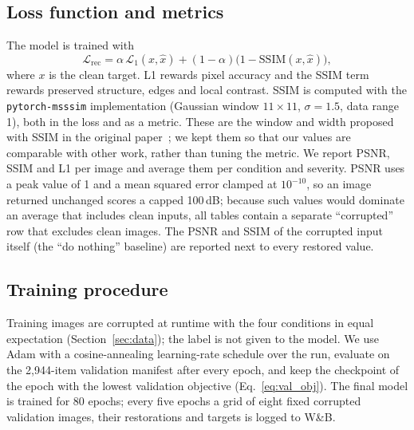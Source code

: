 \documentclass[conference]{IEEEtran}
\begin{document}
\subsection{Loss function and metrics}
The model is trained with
\begin{equation}
\mathcal{L}_{\mathrm{rec}} = \alpha\,\mathcal{L}_{1}(x,\hat{x})
  + (1-\alpha)\bigl(1-\mathrm{SSIM}(x,\hat{x})\bigr),
\label{eq:rec_loss}
\end{equation}
where $x$ is the clean target. L1 rewards pixel accuracy and the SSIM
term~\cite{wang2004ssim} rewards preserved structure, edges and local
contrast. SSIM is computed with the \texttt{pytorch-msssim} implementation
(Gaussian window $11\times11$, $\sigma=1.5$, data range 1), both in the loss
and as a metric.
These are the window and width proposed with SSIM in the original
paper~\cite{wang2004ssim}; we kept them so that our values are comparable with
other work, rather than tuning the metric.
We report PSNR, SSIM and L1 per image and average them per condition and
severity. PSNR uses a peak value of 1 and a mean squared error clamped at
$10^{-10}$, so an image returned unchanged scores a capped 100\,dB; because
such values would dominate an average that includes clean inputs, all
tables contain a separate ``corrupted'' row that excludes clean images. The
PSNR and SSIM of the corrupted input itself (the ``do nothing'' baseline)
are reported next to every restored value.

\subsection{Training procedure}
Training images are corrupted at runtime with the four conditions in equal
expectation (Section~\ref{sec:data}); the label is not given to the model.
We use Adam with a cosine-annealing learning-rate schedule over the run,
evaluate on the 2,944-item validation manifest after every epoch, and keep
the checkpoint of the epoch with the lowest validation objective
(Eq.~\eqref{eq:val_obj}). The final model is trained for 80 epochs; every
five epochs a grid of eight fixed corrupted validation images, their
restorations and targets is logged to W\&B.
\end{document}
